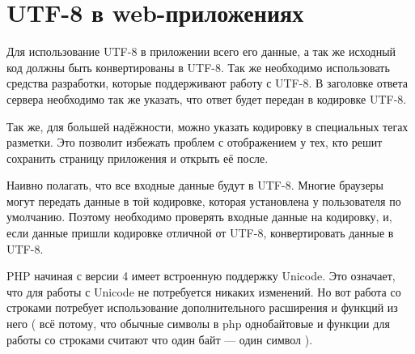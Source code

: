 \section{ UTF-8 в web-приложениях } \label{sect3_9}


Для использование UTF-8 в приложении всего его данные, а так же исходный код должны быть конвертированы в UTF-8. Так же необходимо использовать средства разработки, которые поддерживают работу с UTF-8. В заголовке ответа сервера необходимо так же указать, что ответ будет передан в кодировке UTF-8.

 
Так же, для большей надёжности, можно указать кодировку в специальных тегах разметки. Это позволит избежать проблем с отображением у тех, кто решит сохранить страницу приложения и открыть её после.



Наивно полагать, что все входные данные будут в UTF-8. Многие браузеры могут передать данные в той кодировке, которая установлена у пользователя по умолчанию. Поэтому необходимо проверять входные данные на кодировку, и, если данные пришли кодировке отличной от UTF-8, конвертировать данные в UTF-8.



PHP начиная с версии 4 имеет встроенную поддержку Unicode. Это означает, что для работы с Unicode не потребуется никаких изменений. Но вот работа со строками потребует использование дополнительного расширения и функций из него ( всё потому, что обычные символы в php однобайтовые и функции для работы со строками считают что один байт --- один символ ).


